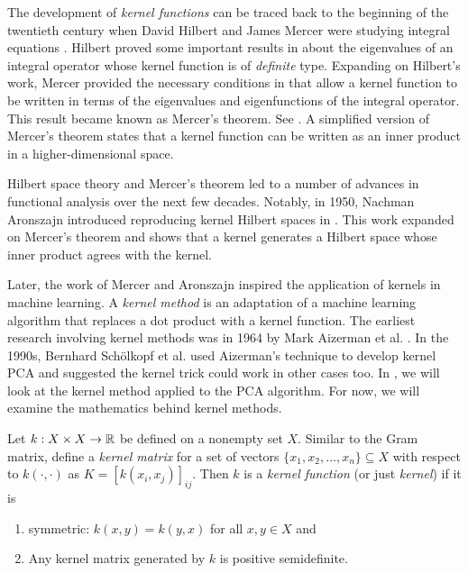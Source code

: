 The development of \textit{kernel functions} can be traced back to the beginning of the twentieth century when David Hilbert and James Mercer were studying integral equations \cite{hofmann2008kernel}.
Hilbert proved some important results in \cite{hilbert1912grundzüge} about the eigenvalues of an integral operator whose kernel function is of \textit{definite} type.
Expanding on Hilbert's work, Mercer provided the necessary conditions in \cite{mercer1909xvi} that allow a kernel function to be written in terms of the eigenvalues and eigenfunctions of the integral operator.
This result became known as Mercer's theorem.
See .
A simplified version of Mercer's theorem states that a kernel function can be written as an inner product in a higher-dimensional space.

Hilbert space theory and Mercer's theorem led to a number of advances in functional analysis over the next few decades.
Notably, in 1950, Nachman Aronszajn introduced reproducing kernel Hilbert spaces in \cite{aronszajn1950theory}.
This work expanded on Mercer's theorem and shows that a kernel generates a Hilbert space whose inner product agrees with the kernel.

Later, the work of Mercer and Aronszajn inspired the application of kernels in machine learning.
A \textit{kernel method} is an adaptation of a machine learning algorithm that replaces a dot product with a kernel function.
The earliest research involving kernel methods was in 1964 by Mark Aizerman et al. \cite{aizerman1964theoretical}.
In the 1990s, Bernhard Sch\"olkopf et al. used Aizerman's technique to develop kernel PCA and suggested the kernel trick could work in other cases too.
In , we will look at the kernel method applied to the PCA algorithm.
For now, we will examine the mathematics behind kernel methods.

\begin{definition}[kernel]
    \label{def:kernel}
    \cite{rudin2020notes}
    Let \(k : X \times X \to \mathbb{R}\) be defined on a nonempty set \(X\).
    Similar to the Gram matrix, define a \textit{kernel matrix} for a set of vectors \(\{x_1, x_2, \dots, x_n\} \subseteq X\) with respect to \(k(\cdot, \cdot)\) as \(K = [k(x_i,x_j)]_{ij}\).
    Then \(k\) is a \textit{kernel function} (or just \textit{kernel}) if it is
    \begin{enumerate}
        \item symmetric: \(k(x,y) = k(y,x)\) for all \(x,y \in X\) and
        \item Any kernel matrix generated by \(k\) is positive semidefinite.
    \end{enumerate}
\end{definition}

